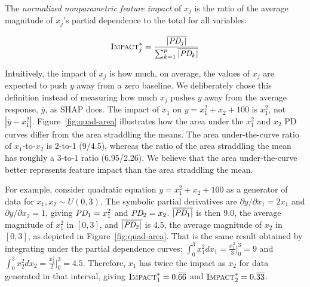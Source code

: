 \documentclass[11pt]{article}
\newcommand{\figref}[1]{Figure~\ref{#1}}
\newcommand{\Imp}{\fontfamily{cmr}\textsc{Impact}}
\begin{document}
~\\
 The {\em normalized nonparametric feature impact} of $x_j$ is the ratio of the average magnitude of $x_j$'s partial dependence to the total for all variables:

\begin{equation}\label{eq:Epd2a}
\Imp_j^{*} = \frac{\overline{|\text{\it PD}_j|}}{\sum_{k=1}^p \overline{|\text{\it PD}_k|}}
\end{equation}

Intuitively, the impact of $x_j$ is how much, on average, the values of $x_j$ are expected to push $y$ away from a zero baseline. We deliberately chose this  definition instead of measuring how much $x_j$ pushes $y$ away from the average response, $\overline{y}$, as SHAP does. The impact of $x_1$ on $y = x_1^2+x_2+100$ is $x_1^2$, not $|\overline{y} - x_1^2|$.  \figref{fig:quad-area} illustrates how the area under the $x_1^2$ and $x_2$ PD curves differ from the area straddling the means. The area under-the-curve ratio of $x_1$-to-$x_2$ is 2-to-1 (9/4.5), whereas the ratio of the area straddling the mean has roughly a 3-to-1 ratio (6.95/2.26). We believe that the area under-the-curve better represents feature impact than the area straddling the mean.

For example, consider quadratic equation $y = x_1^2 + x_2 + 100$ as a generator of data for $x_1, x_2 \sim U(0,3)$. The symbolic partial derivatives are ${\partial y}/{\partial x_1} = 2 x_1$ and ${\partial y}/{\partial x_2} = 1$, giving $\text{\it PD}_1 = x_1^2$ and $\text{\it PD}_2 = x_2$. $\overline{|\text{\it PD}_1|}$ is then 9.0, the average magnitude of $x_1^2$ in $[0,3]$, and $\overline{|\text{\it PD}_2|}$ is 4.5, the average magnitude of $x_2$ in $[0,3]$, as depicted in \figref{fig:quad-area}. That is the same result obtained by integrating under the partial dependence curves:  $\int_0^3 x_1^2 dx_1 = \frac{x_1^3}{3} \big |_0^3 = 9$ and $\int_0^3 x_2^2 dx_2 = \frac{x_2^2}{2} \big |_0^3 = 4.5$.   Therefore, $x_1$ has twice the impact as $x_2$ for data generated in that interval, giving $\Imp_1^{*} = 0.\overline{66}$ and $\Imp_2^{*} = 0.\overline{33}$.
\end{document}
